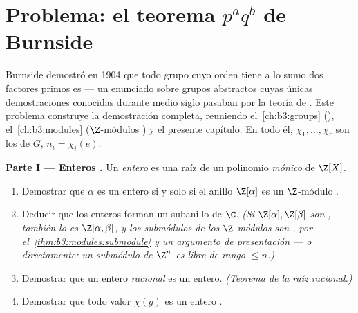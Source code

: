 \section{Problema: el teorema \texorpdfstring{$p^aq^b$}{paqb} de
Burnside}

\begin{problem}\label{pb:b3:representations:1} Burnside demostró en
1904 que todo grupo cuyo orden tiene a lo sumo dos factores primos es
 --- un enunciado sobre grupos
abstractos cuyas únicas demostraciones conocidas durante medio siglo
pasaban por la teoría de
. Este problema
construye la demostración completa, reuniendo el~\cref{ch:b3:groups}
(), el~\cref{ch:b3:modules}
($\Z$-módulos ) y el
presente capítulo. En todo él, $\chi_1, \dots, \chi_r$ son los
 de $G$,
$n_i = \chi_i(e)$.

\medskip
\noindent\textbf{Parte I --- Enteros
.} Un \emph{entero
} es una raíz de un
polinomio \emph{mónico} de $\Z[X]$.
\begin{enumerate}
  \item Demostrar que $\alpha$ es un entero
   si y solo si el anillo
  $\Z[\alpha]$ es un $\Z$-módulo
  . \item Deducir que
  los enteros  forman un
  subanillo de $\C$. \emph{(Si $\Z[\alpha], \Z[\beta]$ son
  , también lo es
  $\Z[\alpha, \beta]$, y los submódulos de los $\Z$-módulos
   son
  , por
  el~\cref{thm:b3:modules:submodule} y un argumento de presentación ---
  o directamente: un submódulo de $\Z^n$ es libre de rango $\leq n$.)}
  \item Demostrar que un entero
   \emph{racional} es un
  entero. \emph{(Teorema de la raíz racional.)} \item Demostrar que todo
  valor  $\chi(g)$ es
  un entero .
\end{enumerate}


\end{problem}
